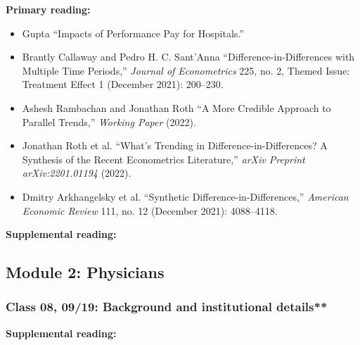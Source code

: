 \documentclass[11pt,]{article}
\providecommand{\tightlist}{%
  \setlength{\itemsep}{0pt}\setlength{\parskip}{0pt}}
\begin{document}
\textbf{Primary reading:}

\begin{itemize}
\tightlist
\item
  Gupta {``Impacts of {Performance} {Pay} for {Hospitals}.''}
\item
  Brantly Callaway and Pedro H. C. Sant'Anna
  {``Difference-in-{Differences} with Multiple Time Periods,''}
  \emph{Journal of Econometrics} 225, no. 2, Themed {Issue}: {Treatment}
  {Effect} 1 (December 2021): 200--230.
\item
  Ashesh Rambachan and Jonathan Roth {``A {More} {Credible} {Approach}
  to {Parallel} {Trends},''} \emph{Working Paper} (2022).
\item
  Jonathan Roth et al. {``What's {Trending} in
  {Difference}-in-{Differences}? {A} {Synthesis} of the {Recent}
  {Econometrics} {Literature},''} \emph{arXiv Preprint arXiv:2201.01194}
  (2022).
\item
  Dmitry Arkhangelsky et al. {``Synthetic
  {Difference}-in-{Differences},''} \emph{American Economic Review} 111,
  no. 12 (December 2021): 4088--4118.
\end{itemize}

\textbf{Supplemental reading:}

\hypertarget{module-2-physicians}{%
\subsection{Module 2: Physicians}\label{module-2-physicians}}

\hypertarget{class-08-0919-background-and-institutional-details}{%
\subsubsection{Class 08, 09/19: Background and institutional
details**}\label{class-08-0919-background-and-institutional-details}}

\textbf{Supplemental reading:}
\end{document}
